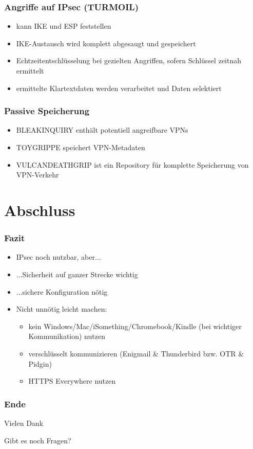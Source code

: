 \documentclass[t]{beamer}
\begin{document}
{

}

\begin{frame}
	\frametitle{Angriffe auf IPsec (TURMOIL)}
	\begin{itemize}
		\vfill
		\item kann IKE und ESP feststellen
		\vfill
		\item IKE-Austausch wird komplett abgesaugt und gespeichert
		\vfill
		\item Echtzeitentschlüsselung bei gezielten Angriffen, sofern Schlüssel zeitnah ermittelt
		\vfill
		\item ermittelte Klartextdaten werden verarbeitet und Daten selektiert
		\vfill
	\end{itemize}
\end{frame}

\begin{frame}
	\frametitle{Passive Speicherung}
	\begin{itemize}
		\vfill
		\item BLEAKINQUIRY enthält potentiell angreifbare VPNs
		\vfill
		\item TOYGRIPPE speichert VPN-Metadaten
		\vfill
		\item VULCANDEATHGRIP ist ein Repository für komplette Speicherung von VPN-Verkehr
		\vfill
	\end{itemize}
\end{frame}

\section{Abschluss}
\begin{frame}
	\frametitle{Fazit}
	\begin{itemize}
		\vfill
		\item IPsec noch nutzbar, aber...
		\vfill
		\item ...Sicherheit auf ganzer Strecke wichtig
		\vfill
		\item ...sichere Konfiguration nötig
		\vfill
		\item Nicht unnötig leicht machen:
			\begin{itemize}
				\item kein Windows/Mac/iSomething/Chromebook/Kindle (bei wichtiger Kommunikation) nutzen
				\item verschlüsselt kommunizieren (Enigmail \& Thunderbird bzw. OTR \& Pidgin)
				\item HTTPS Everywhere nutzen
			\end{itemize}
	\end{itemize}
\end{frame}

\begin{frame}[c]
	\frametitle{Ende}
	\centering
	Vielen Dank
	
	Gibt es noch Fragen?
\end{frame}
\end{document}
